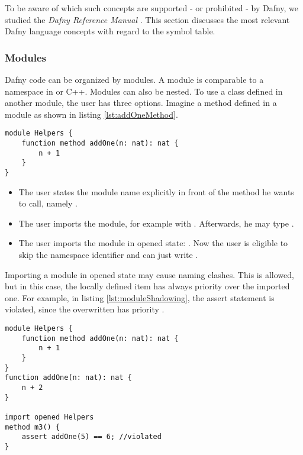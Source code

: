 To be aware of which such concepts are supported - or prohibited - by Dafny, we studied the \textit{Dafny Reference Manual} \cite{dafnyReferenceManual}.
This section discusses the most relevant Dafny language concepts with regard to the symbol table.

\subsubsection{Modules}
Dafny code can be organized by modules.
A module is comparable to a namespace in \CsharpWithSpace or C++.
Modules can also be nested.
To use a class defined in another module, the user has three options.
Imagine a method  defined in a module  as shown in listing \ref{lst:addOneMethod}.

\begin{lstlisting}[language=dafny, caption={Module Example}, captionpos=b, label={lst:addOneMethod}]
module Helpers {
    function method addOne(n: nat): nat {
        n + 1
    }
}
\end{lstlisting}

\begin{itemize}
    \item The user states the module name explicitly in front of the method he wants to call, \linebreak namely .
    \item The user imports the module, for example with .
    Afterwards, he may type .
    \item The user imports the module in opened state: .
    Now the user is eligible to skip the namespace identifier and can just write .
\end{itemize}

Importing a module in opened state may cause naming clashes.
This is allowed, but in this case, the locally defined item has always priority over the imported one.
For example, in listing \ref{lst:moduleShadowing}, the assert statement is violated, since the overwritten  has priority \cite{functionVSMethod}.

\begin{lstlisting}[language = dafny, caption={Naming Clash}, captionpos=b, label={lst:moduleShadowing}]
module Helpers {
    function method addOne(n: nat): nat {
        n + 1
    }
}
function addOne(n: nat): nat {
    n + 2
}

import opened Helpers
method m3() {
    assert addOne(5) == 6; //violated
}
\end{lstlisting}

